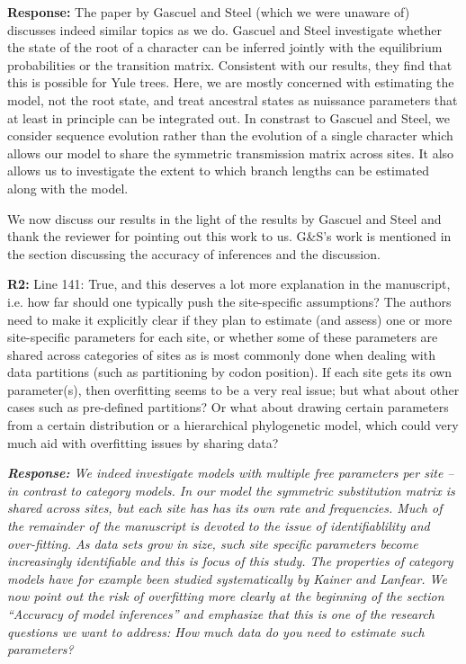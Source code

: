\documentclass[aps,rmp,onecolumn]{revtex4-1}
\newcommand{\refb}[1]{\textbf{R2:} #1}
\newcommand{\response}[1]{{\it {\color{response}\textbf{Response:} #1}}}
\begin{document}
\response{The paper by Gascuel and Steel (which we were unaware of) discusses indeed similar topics as we do. Gascuel and Steel investigate whether the state of the root of a character can be inferred jointly with the equilibrium probabilities or the transition matrix. Consistent with our results, they find that this is possible for Yule trees.
Here, we are mostly concerned with estimating the model, not the root state, and treat ancestral states as nuissance parameters that at least in principle can be integrated out.
In constrast to Gascuel and Steel, we consider sequence evolution rather than the evolution of a single character which allows our model to share the symmetric transmission matrix across sites.
It also allows us to investigate the extent to which branch lengths can be estimated along with the model.

We now discuss our results in the light of the results by Gascuel and Steel and thank the reviewer for pointing out this work to us.
G\&S's work is mentioned in the section discussing the accuracy of inferences and the discussion.
}

\refb{Line 141: True, and this deserves a lot more explanation in the manuscript, i.e. how far should one typically push the site-specific assumptions? The authors need to make it explicitly clear if they plan to estimate (and assess) one or more site-specific parameters for each site, or whether some of these parameters are shared across categories of sites as is most commonly done when dealing with data partitions (such as partitioning by codon position). If each site gets its own parameter(s), then overfitting seems to be a very real issue; but what about other cases such as pre-defined partitions? Or what about drawing certain parameters from a certain distribution or a hierarchical phylogenetic model, which could very much aid with overfitting issues by sharing data?}

\response{We indeed investigate models with multiple free parameters per site -- in contrast to category models.
In our model the symmetric substitution matrix is shared across sites, but each site has has its own rate and frequencies.
Much of the remainder of the manuscript is devoted to the issue of identifiablility and over-fitting.
As data sets grow in size, such site specific parameters become increasingly identifiable and this is focus of this study.
The properties of category models have for example been studied systematically by Kainer and Lanfear.
We now point out the risk of overfitting more clearly at the beginning of the section ``Accuracy of model inferences'' and emphasize that this is one of the research questions we want to address: How much data do you need to estimate such parameters?
}
\end{document}

